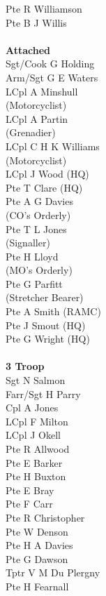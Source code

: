 \begin{multicols}{3}
  Pte R Williamson \\
  Pte B J Willis \\
  \\
  \textbf{Attached} \\
  Sgt/Cook G Holding \\
  Arm/Sgt G E Waters \\
  LCpl A Minshull \\ \indent (Motorcyclist) \\
  LCpl A Partin \\ \indent (Grenadier) \\
  LCpl C H K Williams \\ \indent (Motorcyclist) \\
  LCpl J Wood (HQ) \\
  Pte T Clare (HQ) \\
  Pte A G Davies \\ \indent (CO's Orderly) \\
  Pte T L Jones \\ \indent (Signaller) \\
  Pte H Lloyd \\ \indent (MO's Orderly) \\
  Pte G Parfitt \\ \indent (Stretcher Bearer) \\
  Pte A Smith (RAMC) \\
  Pte J Smout (HQ) \\
  Pte G Wright (HQ) \\
  \\
  \textbf{3 Troop} \\
  Sgt N Salmon \\
  Farr/Sgt H Parry \\
  Cpl A Jones \\
  LCpl F Milton \\
  LCpl J Okell \\
  Pte R Allwood \\
  Pte E Barker \\
  Pte H Buxton \\
  Pte E Bray \\
  Pte F Carr \\
  Pte R Christopher \\
  Pte W Denson \\
  Pte H A Davies \\
  Pte G Dawson \\
  Tptr V M Du Plergny \\
  Pte H Fearnall \\

\end{multicols}

